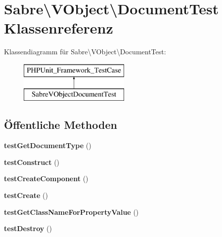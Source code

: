 \hypertarget{class_sabre_1_1_v_object_1_1_document_test}{}\section{Sabre\textbackslash{}V\+Object\textbackslash{}Document\+Test Klassenreferenz}
\label{class_sabre_1_1_v_object_1_1_document_test}
Klassendiagramm für Sabre\textbackslash{}V\+Object\textbackslash{}Document\+Test\+:\begin{figure}[H]
\begin{center}
\leavevmode
\includegraphics[height=2.000000cm]{class_sabre_1_1_v_object_1_1_document_test}
\end{center}
\end{figure}
\subsection*{Öffentliche Methoden}
\begin{DoxyCompactItemize}
\item 
\mbox{\label{class_sabre_1_1_v_object_1_1_document_test_a8e7a2a9eeaa2dbbae9718cafbca02046}} 
{\bfseries test\+Get\+Document\+Type} ()
\item 
\mbox{\label{class_sabre_1_1_v_object_1_1_document_test_afb32a1ae386a9f9e2807dc8f3b07026d}} 
{\bfseries test\+Construct} ()
\item 
\mbox{\label{class_sabre_1_1_v_object_1_1_document_test_aa1ce5eb18f6493f196663d6964f79b5d}} 
{\bfseries test\+Create\+Component} ()
\item 
\mbox{\label{class_sabre_1_1_v_object_1_1_document_test_ab88115ea5cd43de145dd79514500b462}} 
{\bfseries test\+Create} ()
\item 
\mbox{\label{class_sabre_1_1_v_object_1_1_document_test_a499d26554de298923af3c35a248145cc}} 
{\bfseries test\+Get\+Class\+Name\+For\+Property\+Value} ()
\item 
\mbox{\label{class_sabre_1_1_v_object_1_1_document_test_ad3103e41ad011e98fa4bed26afdef1d1}} 
{\bfseries test\+Destroy} ()
\end{DoxyCompactItemize}


